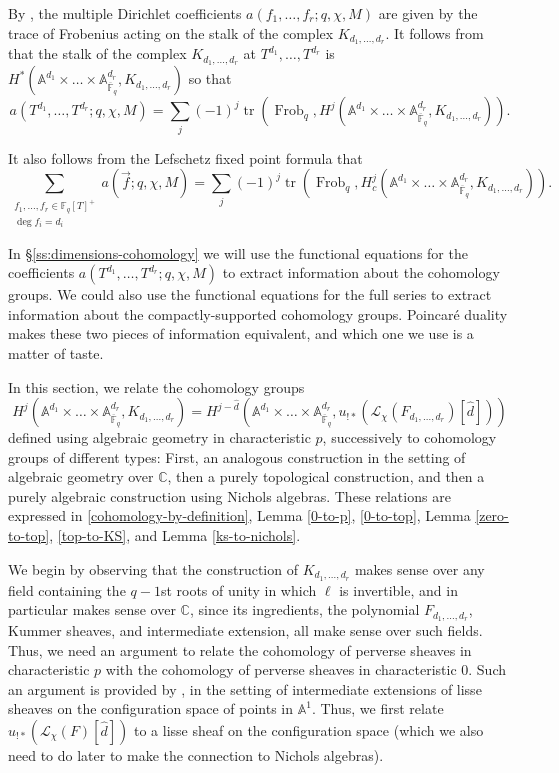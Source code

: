 \documentclass[11pt,letterpaper]{article}
\theoremstyle{definition}
\theoremstyle{remark}
\numberwithin{equation}{section}
\theoremstyle{dotless}
\newcommand{\F}{\mathbb{F}}
\newcommand{\Frob}{\operatorname{Frob}}
\newcommand{\tr}{\operatorname{tr}}
\begin{document}
By \cite[Theorem 1.1 ]{s-amds}, the multiple Dirichlet coefficients $a(f_1,\dots, f_r;q,\chi,M)$ are given by the trace of Frobenius acting on the stalk of the complex $K_{d_1,\dots, d_r}$. It follows from \cite[Lemma 2.16]{s-amds} that the stalk of the complex $K_{d_1,\dots,d_r}$ at $T^{d_1},\dots, T^{d_r}$ is  $H^*( \mathbb A^{d_1}  \times \dots \times \mathbb A^{ d_r }_{\overline{\mathbb F}_q}, K_{d_1,\dots, d_r} )$ so that
\[  a(T^{d_1},\dots, T^{d_r}; q,\chi, M) =  \sum_j (-1)^j \tr( \Frob_q, H^j( \mathbb A^{d_1}  \times \dots \times \mathbb A^{ d_r }_{\overline{\mathbb F}_q}, K_{d_1,\dots, d_r}) ).\]

It also follows from the Lefschetz fixed point formula that
\[ \sum_{\substack{f_1,\dots, f_{r} \in \F_q[T]^+ \\ \deg f_i = d_i}}   a(\vec{f}; q,\chi, M) =  \sum_j (-1)^j \tr( \Frob_q, H^j_c( \mathbb A^{d_1} \times   \dots \times \mathbb A^{d_r }_{\overline{\mathbb F}_q}, K_{d_1,\dots, d_r}) ).\]

In \S\ref{ss:dimensions-cohomology} we will use the functional equations for the coefficients $ a(T^{d_1},\dots, T^{d_r}; q,\chi, M)$ to extract information about the cohomology groups. We could also use the functional equations for the full series to extract information about the compactly-supported cohomology groups. Poincaré duality makes these two pieces of information equivalent, and which one we use is a matter of taste.

In this section, we relate the cohomology groups 
\begin{equation}\label{cohomology-by-definition} H^j( \mathbb A^{d_1 }\times  \dots \times \mathbb A^{ d_r }_{\overline{\mathbb F}_q}, K_{d_1,\dots, d_r})= H^{j-\hat{d}} ( \mathbb A^{d_1 } \times  \dots \times \mathbb A^{ d_r }_{\overline{\mathbb F}_q}, u_{!*} (\mathcal L_{\chi}(F_{d_1,\dots,d_r}) [\hat{d}])) \end{equation} defined using algebraic geometry in characteristic $p$, successively to cohomology groups of different types: First, an analogous construction in the setting of algebraic geometry over $\mathbb C$, then a purely topological construction, and then a purely algebraic construction using Nichols algebras. These relations are expressed in \eqref{cohomology-by-definition}, Lemma \ref{0-to-p}, \eqref{0-to-top}, Lemma \ref{zero-to-top}, \eqref{top-to-KS}, and Lemma \ref{ks-to-nichols}.

We begin by observing that the construction of $K_{d_1,\dots,d_r}$ makes sense over any field containing the $q-1$st roots of unity in which $\ell$ is invertible, and in particular makes sense over $\mathbb C$, since its ingredients, the polynomial $F_{d_1,\dots, d_r}$, Kummer sheaves, and intermediate extension, all make sense over such fields. Thus, we need an argument to relate the cohomology of perverse sheaves in characteristic $p$ with the cohomology of perverse sheaves in characteristic $0$. Such an argument is provided by \cite[Appendix]{Chang}, in the setting of intermediate extensions of lisse sheaves on the configuration space of points in $\mathbb A^1$. Thus, we first relate $u_{!*} (\mathcal L_{\chi}(F) [\hat{d}])$ to a lisse sheaf on the configuration space (which we also need to do later to make the connection to Nichols algebras).
\end{document}
